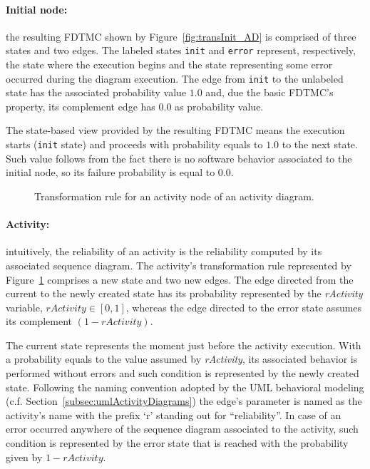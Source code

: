 \paragraph{Initial node: \label{par:initialNodeTransformation}}
the 
resulting FDTMC shown by Figure~\ref{fig:transInit_AD} is comprised of three
states and two edges. The labeled states \texttt{init} and \texttt{error} represent,
respectively,  the state where the execution begins and the state
representing some error occurred during the diagram execution. The edge from
\texttt{init} to the unlabeled state has the  associated probability
value $1.0$ and, due the basic FDTMC's property, its complement edge has $0.0$ as
probability value. 

The state-based view provided by the resulting FDTMC means the execution starts
(\texttt{init} state) and proceeds with probability equals to $1.0$ to the next
state. Such value follows from the fact there is no software behavior associated
to the initial node, so its failure probability is equal to $0.0$. 

\begin{figure}[h!]
\begin{center}
\begin{tikzpicture} 
	\centering
	 
\end{tikzpicture}
\end{center}
\caption{Transformation rule for an activity node of an activity diagram.}
\label{fig:transActiv_AD}
\end{figure}

\paragraph{Activity: \label{par:activityTransformation}} 
intuitively, the reliability of an
activity is the reliability computed by its associated sequence diagram.
The activity's transformation rule represented by
Figure~\ref{fig:transActiv_AD} comprises a new state and two new edges. The
edge directed from the current to the newly created state has its probability
represented by the \textit{rActivity} variable, $rActivity \in [0,1]$, whereas the edge directed to the
error state assumes its complement $(1-rActivity)$.

The current state represents the moment just before the activity execution. With
a probability equals to the value assumed by \emph{rActivity}, its associated
behavior is performed without errors and such condition is represented by the
newly created state. Following the naming convention adopted by the UML behavioral modeling (c.f. Section~\ref{subsec:umlActivityDiagrams}) the edge's parameter is named as the activity's name
with the prefix `r' standing out for ``reliability''. In case of an error
occurred anywhere of the sequence diagram associated to the activity, such
condition is represented by the error state that is reached with the probability
given by $1-rActivity$. 


